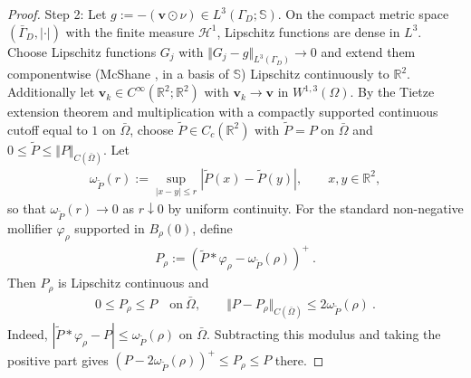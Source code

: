 \documentclass{article}
\theoremstyle{definition}
\newcommand{\bfv}{\boldsymbol{v}}
\begin{document}
\begin{proof}
    Step 2: Let $g := - (\bfv \odot \nu) \in L^3(\Gamma_D; \mathbb S)$. On the compact metric space
    $(\bar\Gamma_D,|\cdot|)$ with the finite measure $\mathcal{H}^1$, Lipschitz functions are dense in $L^3$.
    Choose Lipschitz functions $G_j$ with $\Vert G_j - g\Vert_{L^3(\Gamma_D)}\rightarrow 0$ and
    extend them componentwise (McShane \cite{M34}, in a basis of $\mathbb S$) Lipschitz continuously to $\mathbb R^2$. Additionally let
    $\bfv_k \in C^\infty(\mathbb R^2; \mathbb R^2)$ with $\bfv_k \rightarrow \bfv$ in $W^{1,3}(\Omega)$.
    By the Tietze extension theorem and multiplication with a compactly supported continuous cutoff
    equal to $1$ on $\bar\Omega$, choose $\widetilde P\in C_c(\mathbb R^2)$ with
    $\widetilde P=P$ on $\bar\Omega$ and $0\leq\widetilde P\leq\Vert P\Vert_{C(\bar\Omega)}$.
    Let
    \begin{align*}
        \omega_{\widetilde P}(r):=\sup_{|x-y|\leq r}|\widetilde P(x)-\widetilde P(y)|,
        \qquad x,y\in\mathbb R^2,
    \end{align*}
    so that $\omega_{\widetilde P}(r)\rightarrow0$ as $r\downarrow0$ by uniform continuity.
    For the standard non-negative mollifier $\varphi_\rho$ supported in $B_\rho(0)$, define
    \begin{align*}
        P_\rho := (\widetilde P * \varphi_\rho - \omega_{\widetilde P}(\rho))^+ \ .
    \end{align*}
    Then $P_\rho$ is Lipschitz continuous and
    \begin{align}
        0\leq P_\rho\leq P\quad\text{on}\ \bar\Omega,
        \qquad \Vert P-P_\rho\Vert_{C(\bar\Omega)}\leq2\omega_{\widetilde P}(\rho) \ .
        \label{eq:Prho}
    \end{align}
    Indeed, $|\widetilde P*\varphi_\rho-P|\leq\omega_{\widetilde P}(\rho)$ on $\bar\Omega$.
    Subtracting this modulus and taking the positive part gives
    $(P-2\omega_{\widetilde P}(\rho))^+\leq P_\rho\leq P$ there.


\end{proof}
\end{document}
